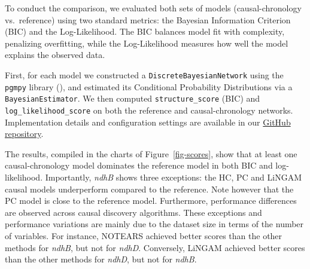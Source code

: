 \documentclass[
]{article}
\theoremstyle{definition}
\theoremstyle{remark}
\begin{document}
To conduct the comparison, we evaluated both sets of models
(causal-chronology vs.~reference) using two standard metrics: the
Bayesian Information Criterion (BIC) and the Log-Likelihood. The BIC
balances model fit with complexity, penalizing overfitting, while the
Log-Likelihood measures how well the model explains the observed data.

First, for each model we constructed a \texttt{DiscreteBayesianNetwork}
using the \texttt{pgmpy} library
(), and estimated its Conditional
Probability Distributions via a \texttt{BayesianEstimator}. We then
computed \texttt{structure\_score} (BIC) and
\texttt{log\_likelihood\_score} on both the reference and
causal-chronology networks. Implementation details and configuration
settings are available in our
\href{https://github.com/rmartosprieto/chloroDAG.git}{GitHub
repository}.

The results, compiled in the charts of Figure~\ref{fig-scores}, show
that at least one causal-chronology model dominates the reference model
in both BIC and log-likelihood. Importantly, \emph{ndhB} shows three
exceptions: the HC, PC and LiNGAM causal models underperform compared to
the reference. Note however that the PC model is close to the reference
model. Furthermore, performance differences are observed across causal
discovery algorithms. These exceptions and performance variations are
mainly due to the dataset size in terms of the number of variables. For
instance, NOTEARS achieved better scores than the other methods for
\emph{ndhB}, but not for \emph{ndhD}. Conversely, LiNGAM achieved better
scores than the other methods for \emph{ndhD}, but not for \emph{ndhB}.
\end{document}
